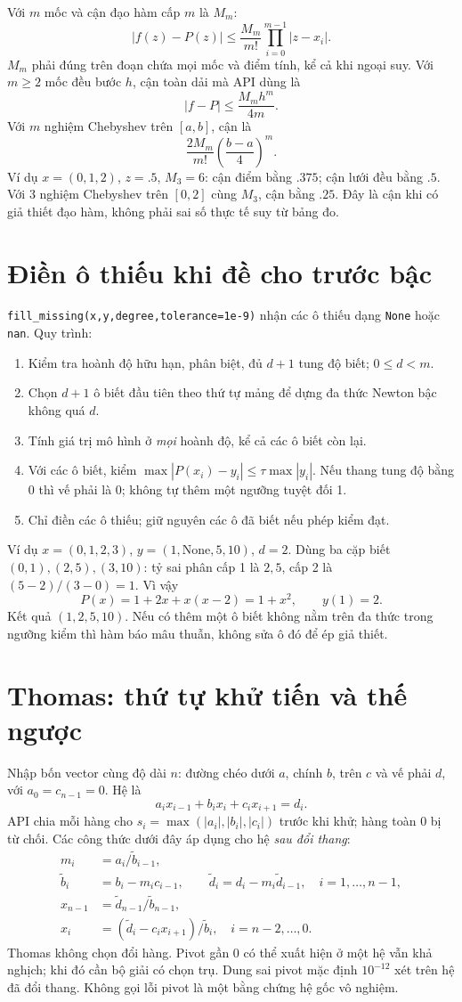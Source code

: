 Với $m$ mốc và cận đạo hàm cấp $m$ là $M_m$:
\[
 |f(z)-P(z)|\le\frac{M_m}{m!}\prod_{i=0}^{m-1}|z-x_i|.
\]
$M_m$ phải đúng trên đoạn chứa mọi mốc và điểm tính, kể cả khi ngoại suy. Với $m\ge2$ mốc đều bước $h$, cận toàn dải mà API dùng là
\[
 |f-P|\le\frac{M_m h^m}{4m}.
\]
Với $m$ nghiệm Chebyshev trên $[a,b]$, cận là
\[
 \frac{2M_m}{m!}\left(\frac{b-a}{4}\right)^m.
\]
Ví dụ $x=(0,1,2)$, $z=.5$, $M_3=6$: cận điểm bằng $.375$; cận lưới đều bằng $.5$. Với 3 nghiệm Chebyshev trên $[0,2]$ cùng $M_3$, cận bằng $.25$. Đây là cận khi có giả thiết đạo hàm, không phải sai số thực tế suy từ bảng đo.

\section{Điền ô thiếu khi đề cho trước bậc}
\texttt{fill\_missing(x,y,degree,tolerance=1e-9)} nhận các ô thiếu dạng \texttt{None} hoặc \texttt{nan}. Quy trình:
\begin{enumerate}
\item Kiểm tra hoành độ hữu hạn, phân biệt, đủ $d+1$ tung độ biết; $0\le d<m$.
\item Chọn $d+1$ ô biết đầu tiên theo thứ tự mảng để dựng đa thức Newton bậc không quá $d$.
\item Tính giá trị mô hình ở \emph{mọi} hoành độ, kể cả các ô biết còn lại.
\item Với các ô biết, kiểm $\max|P(x_i)-y_i|\le\tau\max|y_i|$. Nếu thang tung độ bằng 0 thì vế phải là 0; không tự thêm một ngưỡng tuyệt đối 1.
\item Chỉ điền các ô thiếu; giữ nguyên các ô đã biết nếu phép kiểm đạt.
\end{enumerate}
Ví dụ $x=(0,1,2,3)$, $y=(1,\mathrm{None},5,10)$, $d=2$. Dùng ba cặp biết $(0,1),(2,5),(3,10)$: tỷ sai phân cấp 1 là $2,5$, cấp 2 là $(5-2)/(3-0)=1$. Vì vậy
\[
 P(x)=1+2x+x(x-2)=1+x^2,\qquad y(1)=2.
\]
Kết quả $(1,2,5,10)$. Nếu có thêm một ô biết không nằm trên đa thức trong ngưỡng kiểm thì hàm báo mâu thuẫn, không sửa ô đó để ép giả thiết.

\section{Thomas: thứ tự khử tiến và thế ngược}
Nhập bốn vector cùng độ dài $n$: đường chéo dưới $a$, chính $b$, trên $c$ và vế phải $d$, với $a_0=c_{n-1}=0$. Hệ là
\[
 a_ix_{i-1}+b_ix_i+c_ix_{i+1}=d_i.
\]
API chia mỗi hàng cho $s_i=\max(|a_i|,|b_i|,|c_i|)$ trước khi khử; hàng toàn 0 bị từ chối. Các công thức dưới đây áp dụng cho hệ \emph{sau đổi thang}:
\begin{align*}
 m_i&=a_i/\widetilde b_{i-1},\\
 \widetilde b_i&=b_i-m_i c_{i-1},\qquad
 \widetilde d_i=d_i-m_i\widetilde d_{i-1},\quad i=1,\ldots,n-1,\\
 x_{n-1}&=\widetilde d_{n-1}/\widetilde b_{n-1},\\
 x_i&=(\widetilde d_i-c_ix_{i+1})/\widetilde b_i,\quad i=n-2,\ldots,0.
\end{align*}
Thomas không chọn đổi hàng. Pivot gần 0 có thể xuất hiện ở một hệ vẫn khả nghịch; khi đó cần bộ giải có chọn trụ. Dung sai pivot mặc định $10^{-12}$ xét trên hệ đã đổi thang. Không gọi lỗi pivot là một bằng chứng hệ gốc vô nghiệm.

